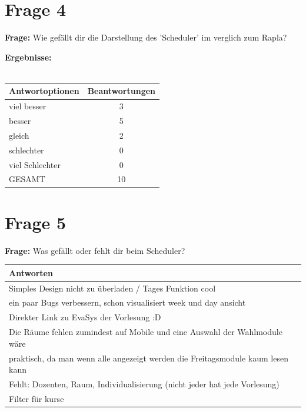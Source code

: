 \section{Frage 4 \label{frage04}}
\textbf{Frage:} Wie gefällt dir die Darstellung des 'Scheduler' im verglich zum Rapla?
\begin{figure}
	\centering
\end{figure}
\textbf{Ergebnisse:}\\
\\
\begin{tabular}{|l|c|}\hline
	\textbf{Antwortoptionen} & \textbf{Beantwortungen} \\\hline
	viel besser  	& 3 \\\hline
	besser			& 5 \\\hline
	gleich 			& 2 \\\hline
	schlechter 		& 0 \\\hline
	viel Schlechter	& 0 \\\hline
	GESAMT			& 10 \\\hline			
\end{tabular}

\section{Frage 5 \label{frage05}}
\textbf{Frage:} Was gefällt oder fehlt dir beim Scheduler?\\
\begin{tabular}{|l|}\hline
	\textbf{Antworten} \\\hline
	Simples Design nicht zu überladen / Tages Funktion cool  \\\hline
	ein paar Bugs verbessern, schon visualisiert week und day ansicht \\\hline
	Direkter Link zu EvaSys der Vorlesung :D \\\hline
	Die Räume fehlen zumindest auf Mobile und eine Auswahl der Wahlmodule wäre\\
	praktisch, da man wenn alle angezeigt werden die Freitagsmodule kaum lesen kann 
	\\\hline
	Fehlt: Dozenten, Raum, Individualisierung (nicht jeder hat jede Vorlesung) \\\hline
	Filter für kurse \\\hline			
\end{tabular}

